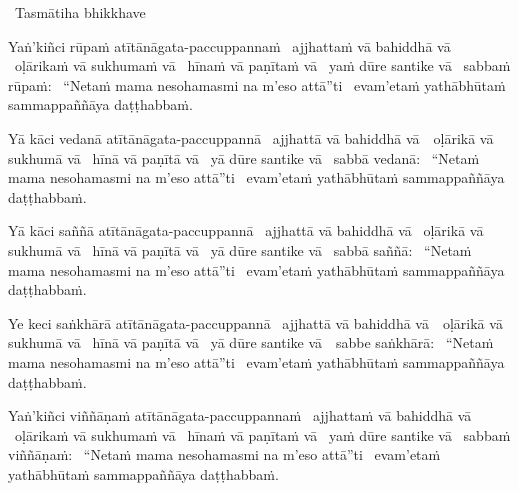 \begin{pali-leader}
  \anglebracketleft\ \hspace{-0.5mm}Tasmātiha bhikkhave \hspace{-0.5mm}\anglebracketright\
\end{pali-leader}
\begin{pali-hangtogether}
  Yaṅ'kiñci rūpaṁ atītānāgata-paccuppannaṁ \breathmark\ ajjhattaṁ vā bahiddhā vā \breathmark\ oḷārikaṁ vā sukhumaṁ vā \breathmark\ hīnaṁ vā paṇītaṁ vā \breathmark\ yaṁ dūre santike vā \breathmark\ sabbaṁ rūpaṁ: \breathmark\ ``Netaṁ mama nesohamasmi na m'eso attā''ti \breathmark\ evam'etaṁ yathābhūtaṁ sammappaññāya daṭṭhabbaṁ.
\end{pali-hangtogether}

\begin{pali-hang}
  Yā kāci vedanā atītānāgata-paccuppannā \breathmark\ ajjhattā vā bahiddhā \mbox{vā}~\breathmark\ oḷārikā vā sukhumā vā \breathmark\ hīnā vā paṇītā vā \breathmark\ yā dūre santike vā \breathmark\ sabbā vedanā: \breathmark\ ``Netaṁ mama nesohamasmi na m'eso attā''ti \breathmark\ evam'etaṁ yathābhūtaṁ sammappaññāya daṭṭhabbaṁ.
\end{pali-hang}

\begin{pali-hang}
  Yā kāci saññā atītānāgata-paccuppannā \breathmark\ ajjhattā vā bahiddhā vā \breathmark\ oḷārikā vā sukhumā vā \breathmark\ hīnā vā paṇītā vā \breathmark\ yā dūre santike vā \breathmark\ sabbā saññā: \breathmark\ ``Netaṁ mama nesohamasmi na m'eso attā''ti \breathmark\ evam'etaṁ yathābhūtaṁ sammappaññāya daṭṭhabbaṁ.
\end{pali-hang}

\begin{pali-hang}
  Ye keci saṅkhārā atītānāgata-paccuppannā \breathmark\ ajjhattā vā bahiddhā \mbox{vā}~\breathmark\ oḷārikā vā sukhumā vā \breathmark\ hīnā vā paṇītā vā \breathmark\ yā dūre santike \mbox{vā}~\breathmark\ sabbe saṅkhārā: \breathmark\ ``Netaṁ mama nesohamasmi na m'eso attā''ti \breathmark\ evam'etaṁ yathābhūtaṁ sammappaññāya daṭṭhabbaṁ.
\end{pali-hang}

\begin{pali-hang}
  Yaṅ'kiñci viññāṇaṁ atītānāgata-paccuppannaṁ \breathmark\ ajjhattaṁ vā bahiddhā vā \breathmark\ oḷārikaṁ vā sukhumaṁ vā \breathmark\ hīnaṁ vā paṇītaṁ vā \breathmark\ yaṁ dūre santike vā \breathmark\ sabbaṁ viññāṇaṁ: \breathmark\ ``Netaṁ mama nesohamasmi na m'eso attā''ti \breathmark\ evam'etaṁ yathābhūtaṁ sammappaññāya daṭṭhabbaṁ.
\end{pali-hang}

